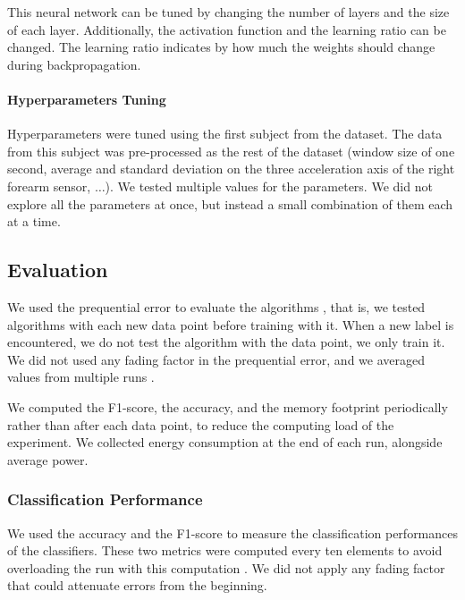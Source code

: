 This neural network can be tuned by changing the
number of layers and the size of each layer.
Additionally, the activation function and the
learning ratio can be changed. The learning ratio
indicates by how much the weights should change
during backpropagation.

\paragraph{Hyperparameters Tuning}
Hyperparameters were tuned using the first
subject from the \banosdataset dataset.  The data from
this subject was pre-processed as the rest of
the \banosdataset dataset (window size of one second,
average and standard deviation on the three
acceleration axis of the right forearm sensor,
$\ldots$). We tested multiple values for the
parameters.  We did
not explore all the parameters at once, but
instead a small combination of them each at a
time. 

\subsection{Evaluation}
We used the prequential error to evaluate the algorithms , that is, we tested
algorithms with each new data point before training with it. When a
new label is encountered, we do  not test the algorithm with the data point, we
only train it. We did not used any fading factor in the prequential error, and we averaged
values from multiple runs .

We computed the F1-score, the accuracy, and the memory footprint periodically
rather than after each data point, to reduce the computing load of the experiment.
We collected energy consumption at the end of each run, alongside average power.


\subsubsection{Classification Performance}
We used the accuracy and the F1-score to measure the classification
performances of the classifiers. These two metrics were computed every ten
elements to avoid overloading the run with this computation . We
did not apply any fading factor that could attenuate errors from the
beginning.

